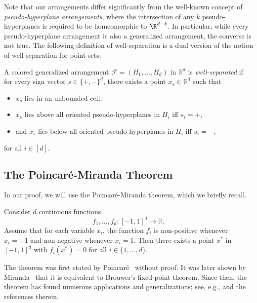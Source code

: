 %
Note that our arrangements differ significantly from the well-known concept of \emph{pseudo-hyperplane arrangements}, where the intersection of any $k$ pseudo-hyperplanes is required to be homeomorphic to $\R^{d - k}$. In particular, while every pseudo-hyperplane arrangement is also a generalized arrangement, the converse is not true. 
%
The following definition of well-separation is a dual version of the notion of well-separation for point sets.
%
\begin{definition}
A colored generalized arrangement $\mathcal{F}=(H_1, \dots, H_d)$ in $\mathbb{R}^d$ is \emph{well-separated} if for every sign vector $s \in \{+, -\}^d$, there exists a point $x_s \in \mathbb{R}^d$ such that 
\begin{itemize}
    \item $x_s$ lies in an unbounded cell,
    \item $x_s$ lies above all oriented pseudo-hyperplanes in $H_i$ iff $s_i = +$,
    \item and $x_s$ lies below all oriented pseudo-hyperplanes in $H_i$ iff $s_i = -$,
\end{itemize}
for all $i \in [d]$.
\end{definition}
%
%
%
\subsection{The Poincar\'{e}-Miranda Theorem}
\label{sec:poincare-miranda}
%
In our proof, we will use the Poincar\'{e}-Miranda theorem, which we briefly recall.
%
\begin{theorem}
Consider $d$ continuous functions
\[f_1,\ldots,f_d: [-1,1]^d\rightarrow \mathbb{R}.\]
Assume that for each variable $x_i$, the function $f_i$ is non-positive whenever $x_i=-1$ and non-negative whenever $x_i=1$.
Then there exists a point $x^*$ in $[-1,1]^d$ with $f_i(x^*)=0$ for all $i\in\{1,\ldots,d\}$.
\end{theorem}
%
The theorem was first stated by Poincar\'{e}~\cite{poincare1883} without proof. It was later shown by Miranda~\cite{miranda1940} that it is equivalent to Brouwer’s fixed point theorem.
Since then, the theorem has found numerous applications and generalizations; see, e.g., \cite{ariza2019poincare} and the references therein.
%

